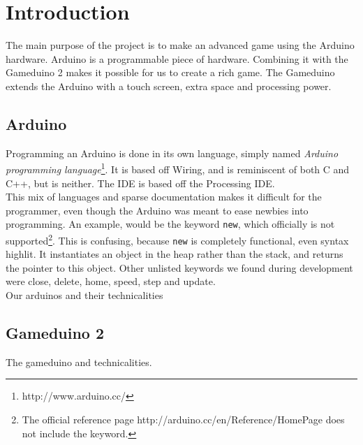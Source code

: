 \chapter{Introduction}
The main purpose of the project is to make an advanced game using the Arduino hardware.
Arduino is a programmable piece of hardware. Combining it with the  Gameduino 2 makes
it possible for us to create a rich game. The Gameduino extends the Arduino with a
touch screen, extra space and processing power.
\section{Arduino} %
Programming an Arduino is done in its own language, simply named \emph{Arduino programming language}\footnote{http://www.arduino.cc/}. It is based off Wiring, and is reminiscent of both C and C++, but is neither. The IDE is based off the Processing IDE.\\
This mix of languages and sparse documentation makes it difficult for the programmer, even though the Arduino was meant to ease newbies into programming. An example, would be the keyword {\tt new}, which officially is not supported\footnote{The official reference page http://arduino.cc/en/Reference/HomePage does not include the keyword.}. This is confusing, because {\tt new} is completely functional, even syntax highlit. It instantiates an object in the heap rather than the stack, and returns the pointer to this object. Other unlisted keywords we found during development were close, delete, home, speed, step and update.\\ %
Our arduinos and their technicalities
\section{Gameduino 2}
The gameduino and technicalities.